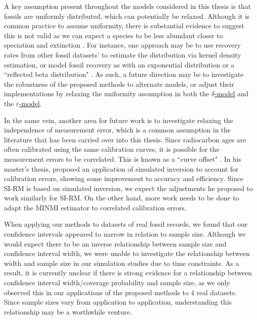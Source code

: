 A key assumption present throughout the models considered in this thesis is that fossils are uniformly distributed, which can potentially be relaxed. Although it is common practice to assume uniformity, there is substantial evidence to suggest this is not valid as we can expect a species to be less abundant closer to speciation and extinction \cite{Lee2010, WangMarshall2016}. For instance, one approach may be to use recovery rates from other fossil datasets' to estimate the distribution via kernel density estimation, or model fossil recovery as with an exponential distribution or a ``reflected beta distribution" \cite{Bradshaw2012, Wang2016}. As such, a future direction may be to investigate the robustness of the proposed methods to alternate models, or adjust their implementations by relaxing the uniformity assumption in both the \hyperref[model: no-measurement-error]{$\delta$-model} and the \hyperref[model: measurement-error]{$\varepsilon$-model}.

In the same vein, another area for future work is to investigate relaxing the independence of measurement error, which is a common assumption in the literature that has been carried over into this thesis. Since radiocarbon ages are often calibrated using the same calibration curves, it is possible for the measurement errors to be correlated. This is known as a ``curve offset" \cite{Ramsey2010}. In his master's thesis, \citet{King2020} proposed an application of simulated inversion to account for calibration errors, showing some improvement to accuracy and efficiency. Since SI-RM is based on simulated inversion, we expect the adjustments he proposed to work similarly for SI-RM. On the other hand, more work needs to be done to adapt the MINMI estimator to correlated calibration errors.

When applying our methods to datasets of real fossil records, we found that our confidence intervals appeared to narrow in relation to sample size. Although we would expect there to be an inverse relationship between sample size and confidence interval width, we were unable to investigate the relationship between width and sample size in our simulation studies due to time constraints. As a result, it is currently unclear if there is strong evidence for a relationship between confidence interval width/coverage probability and sample size, as we only observed this in our applications of the proposed methods to 4 real datasets. Since sample sizes vary from application to application, understanding this relationship may be a worthwhile venture.

